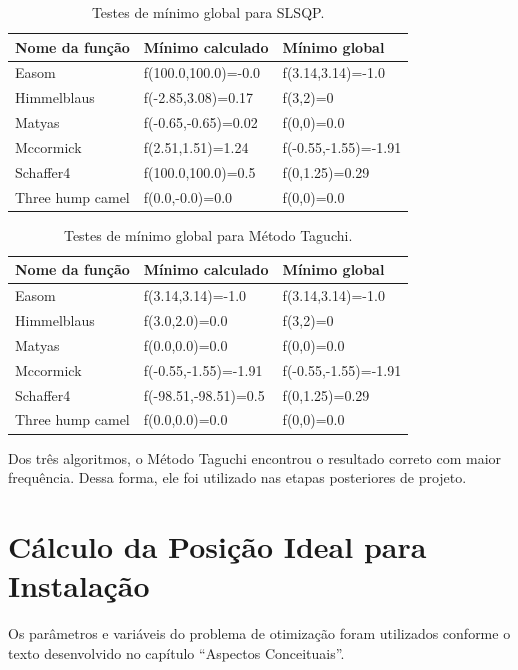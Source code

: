 \documentclass[]{politex}
\begin{document}
\begin{table}[H]
\centering
\begin{tabular}{l|l|l}
 Nome da função & Mínimo calculado & Mínimo global \\ \hline
\rowcolor{Gray}
Easom  &  f(100.0,100.0)=-0.0  &  f(3.14,3.14)=-1.0 \\
\rowcolor{Gray}
Himmelblaus  &  f(-2.85,3.08)=0.17  &  f(3,2)=0 \\
\rowcolor{Gray}
Matyas  &  f(-0.65,-0.65)=0.02  &  f(0,0)=0.0 \\
\rowcolor{Gray}
Mccormick  &  f(2.51,1.51)=1.24  &  f(-0.55,-1.55)=-1.91 \\
\rowcolor{Gray}
Schaffer4  &  f(100.0,100.0)=0.5  &  f(0,1.25)=0.29 \\
Three hump camel  &  f(0.0,-0.0)=0.0  &  f(0,0)=0.0 \\
\end{tabular}
\caption{Testes de mínimo global para SLSQP.}
\label{table:test-slsqp}
\end{table}

\begin{table}[H]
\centering
\begin{tabular}{l|l|l}
Nome da função & Mínimo calculado & Mínimo global \\ \hline
Easom  &  f(3.14,3.14)=-1.0  &  f(3.14,3.14)=-1.0 \\
Himmelblaus  &  f(3.0,2.0)=0.0  &  f(3,2)=0 \\
Matyas  &  f(0.0,0.0)=0.0  &  f(0,0)=0.0 \\
Mccormick  &  f(-0.55,-1.55)=-1.91  &  f(-0.55,-1.55)=-1.91 \\
\rowcolor{Gray}
Schaffer4  &  f(-98.51,-98.51)=0.5  &  f(0,1.25)=0.29 \\
Three hump camel  &  f(0.0,0.0)=0.0  &  f(0,0)=0.0 \\
\end{tabular}
\caption{Testes de mínimo global para Método Taguchi.}
\label{table:test-taguchi}
\end{table}

Dos três algoritmos, o Método Taguchi encontrou o resultado correto com maior
frequência. Dessa forma, ele foi utilizado nas etapas posteriores de projeto.

\section{Cálculo da Posição Ideal para Instalação}

Os parâmetros e variáveis do problema de otimização foram utilizados conforme o
texto desenvolvido no capítulo ``Aspectos Conceituais''.
\end{document}
